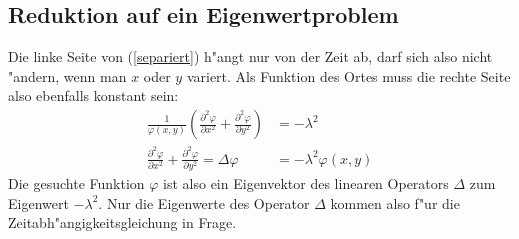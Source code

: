 \subsection{Reduktion auf ein Eigenwertproblem}
Die linke Seite von (\ref{separiert}) h"angt nur von der Zeit ab, darf sich
also nicht "andern, wenn man $x$ oder $y$ variert. Als Funktion des Ortes
muss die rechte Seite also ebenfalls konstant sein:
\begin{align*}
\frac1{\varphi(x,y)}\left(
\frac{\partial^2\varphi}{\partial x^2}
+
\frac{\partial^2\varphi}{\partial y^2}
\right)&=-\lambda^2\\
\frac{\partial^2\varphi}{\partial x^2}
+
\frac{\partial^2\varphi}{\partial y^2}
=\Delta\varphi
&=-\lambda^2
\varphi(x,y)
\end{align*}
Die gesuchte Funktion $\varphi$ ist also ein Eigenvektor des linearen
Operators $\Delta$ zum Eigenwert $-\lambda^2$.
Nur die Eigenwerte des Operator $\Delta$ kommen also f"ur die
Zeitabh"angigkeitsgleichung in Frage.

